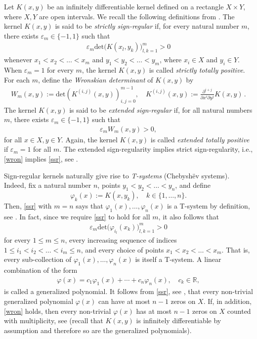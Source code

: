 \documentclass[twoside,a4paper]{amsart}
\newcommand{\R}     {\mathbb{R}}
\renewcommand{\det}{\mathrm{det}}
\theoremstyle{remark}
\begin{document}
Let \( K(x,y)\) be an infinitely differentiable kernel defined on a rectangle \( X\times Y \), where \( X,Y \) are open intervals. We recall the following definitions from \cite[Section~2.1]{Karlin}. The kernel \( K(x,y)\) is said to be \emph{strictly sign-regular} if, for every natural number \( m \), there exists \( \varepsilon_m\in\{-1,1\} \) such that
\begin{align}
\label{ssr}
\varepsilon_m\det\big(  K(x_l,y_k) \big)_{l,k=1}^m >0
\end{align}
whenever \( x_1<x_2<\ldots<x_m\) and \( y_1<y_2<\ldots <y_m\), where  \(x_i\in X\) and \( y_i\in Y \). When \( \varepsilon_m=1 \) for every $m$, the kernel \( K(x,y)\) is called \emph{strictly totally positive}. For each $m$, define the {\it Wronskian determinant} of  \( K(x,y) \) by
\begin{align}
\label{Wm}
W_m(x,y) := \det\left( K^{(i,j)}(x,y) \right)_{i,j=0}^{m-1}, \quad K^{(i,j)}(x,y) := \frac{\partial^{i+j}}{\partial x^i\partial y^j} K(x,y)\,.
\end{align}
 The kernel \( K(x,y)\) is said to be \emph{extended sign-regular} if, for all natural numbers \( m \), there exists  \( \varepsilon_m\in\{-1,1\} \) such that  
\begin{align}
\label{wron}
\varepsilon_mW_m(x,y)>0,
\end{align}
 for all \( x\in X,y\in Y\).  Again, the kernel \( K(x,y)\) is called \emph{extended totally positive} if \( \varepsilon_m=1\) for all \( m \). The extended sign-regularity implies strict sign-regularity, i.e., \eqref{wron} implies \eqref{ssr}, see \cite[Theorem~~2.6]{Karlin}.

Sign-regular kernels naturally give rise to \emph{T-systems} (Chebysh\"ev systems). Indeed, fix a natural number \( n \), points \( y_1<y_2<\ldots <y_n \), and define
\[
\varphi_k(x) := K(x,y_k), \quad k\in\{1,\ldots,n\}.
\]
Then, \eqref{ssr} with \( m=n \) says that \( \varphi_1(x),\ldots,\varphi_n(x)\) is a T-system by definition, see \cite[Definition~III.1.3]{Pinkus}. In fact, since we require \eqref{ssr} to hold for all \( m \), it also follows that
\begin{align}
\label{descartes}
\varepsilon_m\det\big(\varphi_{i_l}(x_k)\big)_{l,k=1}^m>0
\end{align}
for every \( 1\leq m\leq n \), every increasing sequence of indices \( 1\leq i_1<i_2<\ldots<i_m\leq n \), and every choice of points \( x_1<x_2<\ldots<x_m \). That is, every sub-collection of \( \varphi_1(x),\ldots,\varphi_n(x)\) is itself a T-system. A linear combination of the form
\begin{align}
\label{fg1}
\varphi(x) = c_1\varphi_1(x) + \cdots + c_n\varphi_n(x), \quad c_k\in\R,
\end{align}
is called a generalized polynomial. It follows from \eqref{ssr}, see \cite[Proposition~III.1.3]{Pinkus}, that every non-trivial generalized polynomial \( \varphi(x)\) can have at most \( n-1 \) zeros on \( X \). If, in addition,  \eqref{wron} holds, then every non-trivial \( \varphi(x)\) has at most \( n-1 \) zeros on \( X \) counted  with multiplicity, see \cite[Proposition~III.1.6]{Pinkus} (recall that \( K(x,y)\) is infinitely differentiable by assumption and therefore so are the generalized polynomials).
\end{document}

